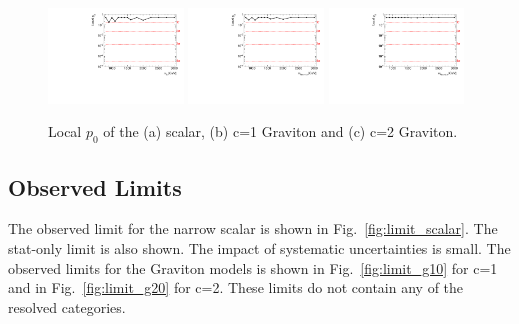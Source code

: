 \begin{figure}[htbp!]
\begin{center}
\includegraphics[width=0.32\textwidth,angle=-90]{figures/boosted/results/p0_s_allmasses_boosted.pdf}
\includegraphics[width=0.32\textwidth,angle=-90]{figures/boosted/results/p0_g10_allmasses_boosted.pdf}
\includegraphics[width=0.32\textwidth,angle=-90]{figures/boosted/results/p0_g20_allmasses_boosted.pdf} 
\caption{Local $p_0$ of the (a) scalar, (b) c=1 Graviton and (c) c=2 Graviton.}
\label{fig:localp0}
\end{center}
\end{figure}

\subsection{Observed Limits}
\label{sec:observedlimits}

The observed limit for the narrow scalar is shown in Fig.~\ref{fig:limit_scalar}. The stat-only limit is also shown. The impact of systematic uncertainties is small. The observed limits for the Graviton models is shown in Fig.~\ref{fig:limit_g10} for c=1 and in Fig.~\ref{fig:limit_g20} for c=2. These limits do not contain any of the resolved categories.

